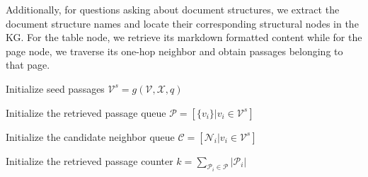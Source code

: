 Additionally, for questions asking about document structures, we extract the document structure names and locate their corresponding structural nodes in the KG. For the table node, we retrieve its markdown formatted content while for the page node, we traverse its one-hop neighbor and obtain passages belonging to that page.


\SetAlCapSty{}
\SetAlgoNoEnd
\begin{algorithm}[tb]
 \DontPrintSemicolon
 \small
 
Initialize seed passages $\mathcal{V}^s = g(\mathcal{V}, \mathcal{X}, q)$

Initialize the retrieved passage queue $\mathcal{P} = [\{v_i\}|v_i \in \mathcal{V}^{s}]$
 
Initialize the candidate neighbor queue $\mathcal{C} = [\mathcal{N}_i|v_i \in \mathcal{V}^s]$

Initialize the retrieved passage counter $k = \sum_{\mathcal{P}_i \in \mathcal{P}}|\mathcal{P}_i|$
 

\caption{\small LLM-based KG Traversal Algorithm to Retrieve Relevant Context for Content-based Question.}
\label{alg-GPL}
\end{algorithm}


